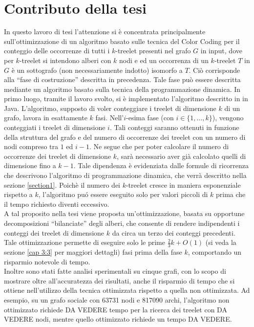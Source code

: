 \section{Contributo della tesi}

In questo lavoro di tesi l'attenzione si è concentrata principalmente sull'ottimizzazione di un algoritmo basato sulle tecnica del Color Coding per il conteggio delle occorrenze di tutti i $k$-treelet presenti nel grafo $G$ in input, dove per $k$-treelet  si intendono alberi con $ k $ nodi e ed un occorrenza di un $k$-treelet $T$ in $G$ è un sottografo (non necessariamente indotto) isomorfo a $T$.
Ci\`o corrisponde alla ``fase di costruzione'' descritta in precedenza. Tale fase pu\`o essere descritta mediante un algoritmo basato sulla tecnica della programmazione dinamica.
In primo luogo, tramite il lavoro svolto, si \`e implementato l'algoritmo descritto in  \cite{bressan2018motif} in Java.
L'algoritmo, supposto di voler conteggiare i treelet di dimensione $ k $ di un grafo, lavora in esattamente  $k$ fasi.
Nell'$i$-esima fase (con $i \in \{1, \dots, k\}$), vengono conteggiati i treelet di dimensione $i$.
Tali conteggi saranno ottenuti in funzione della struttura del grafo e del numero di occorrenze dei treelet con un numero di nodi compreso tra $1$ ed $i-1$.
Ne segue che per poter calcolare il numero di occorrenze dei treelet di dimensione $ k $, sar\`a necessario aver gi\`a calcolato quelli di dimensione fino a $ k-1$.
Tale dipendenza \`e evidenziata dalle formule di ricorrenza che descrivono l'algoritmo di programmazione dinamica, che verr\`a descritto nella sezione \ref{section1}.
Poich\`e il numero dei $ k $-treelet cresce in maniera esponenziale rispetto a $ k $, l'algoritmo pu\'o essere eseguito solo per valori piccoli di $ k $ prima che il tempo richiesto diventi eccessivo.\\
A tal proposito nella tesi viene proposta un'ottimizzazione, basata su opportune decomposizioni ``bilanciate'' degli alberi, che consente di rendere indipendenti i conteggi dei treelet di dimensione $ k $ da circa un terzo dei conteggi precedenti.
Tale ottimizzazione permette di eseguire solo le prime $\frac{2}{3} k + O(1)$ (si veda la sezione \ref{cap 3:3} per maggiori dettagli) fasi prima della fase $ k $, comportando un risparmio notevole di tempo.\\
Inoltre sono stati fatte analisi sperimentali su cinque grafi, con lo scopo di mostrare oltre all'accuratezza dei risultati, anche il risparmio di tempo che si ottiene nell'utilizzo della tecnica ottimizzata rispetto a quella non ottimizzata.
Ad esempio, su un grafo sociale con 63731 nodi e 817090 archi, l'algoritmo non ottimizzato richiede DA VEDERE tempo per la ricerca dei treelet con DA VEDERE nodi, mentre quello ottimizzato richiede un tempo DA VEDERE.


